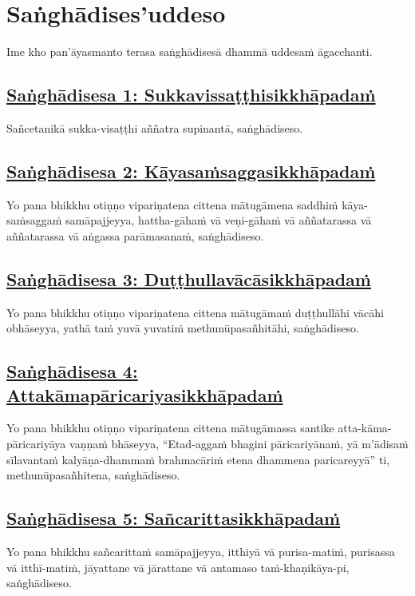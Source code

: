 \setsecheadstyle{\sectionFmt}
\section{Saṅghādises'uddeso}
\label{sd}

\begin{intro}
  Ime kho pan'āyasmanto terasa saṅghādisesā dhammā uddesaṁ āgacchanti.
\end{intro}

\subsection*{\hyperref[comm1]{Saṅghādisesa 1: Sukkavissaṭṭhisikkhāpadaṁ}}
\label{sd1}
Sañcetanikā sukka-visaṭṭhi aññatra supinantā, saṅghādiseso.

\subsection*{\hyperref[comm2]{Saṅghādisesa 2: Kāyasaṁsaggasikkhāpadaṁ}}
\label{sd2}
Yo pana bhikkhu otiṇṇo vipariṇatena cittena mātugāmena saddhiṁ kāya-saṁsaggaṁ samāpajjeyya, hattha-gāhaṁ vā veṇi-gāhaṁ vā aññatarassa vā aññatarassa vā aṅgassa parāmasanaṁ, saṅghādiseso.

\subsection*{\hyperref[comm3]{Saṅghādisesa 3: Duṭṭhullavācāsikkhāpadaṁ}}
\label{sd3}
Yo pana bhikkhu otiṇṇo vipariṇatena cittena mātugāmaṁ duṭṭhullāhi vācāhi obhāseyya, yathā taṁ yuvā yuvatiṁ methunūpasañhitāhi, saṅghādiseso.

\subsection*{\hyperref[comm4]{Saṅghādisesa 4: Attakāmapāricariyasikkhāpadaṁ}}
\label{sd4}
Yo pana bhikkhu otiṇṇo vipariṇatena cittena mātugāmassa santike atta-kāma-pāricariyāya vaṇṇaṁ bhāseyya, “Etad-aggaṁ bhagini pāricariyānaṁ, yā m'ādisaṁ sīlavantaṁ kalyāṇa-dhammaṁ brahmacāriṁ etena dhammena paricareyyā” ti, methunūpasañhitena, saṅghādiseso.

\subsection*{\hyperref[comm5]{Saṅghādisesa 5: Sañcarittasikkhāpadaṁ}}
\label{sd5}
Yo pana bhikkhu sañcarittaṁ samāpajjeyya, itthiyā vā purisa-matiṁ, purisassa vā itthī-matiṁ, jāyattane vā jārattane vā antamaso taṁ-khaṇikāya-pi, saṅghādiseso.

